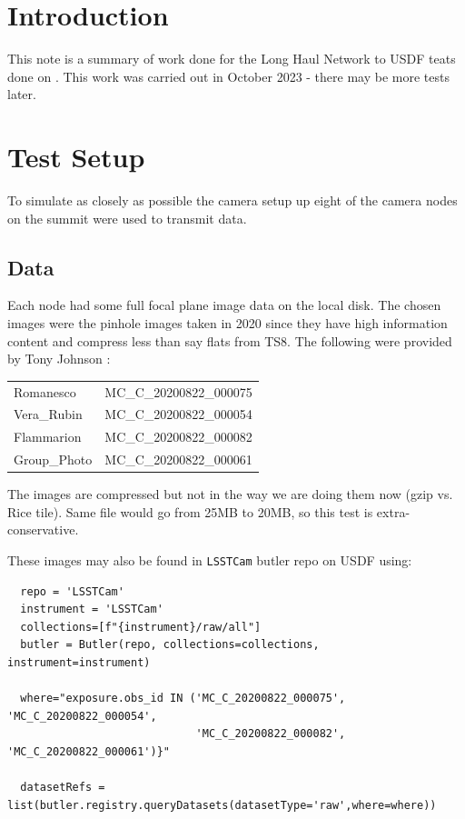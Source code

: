 
\section{Introduction}

This note is a summary of work done for the Long Haul Network to USDF teats done on .
This work was carried out in October 2023 - there may be more tests later.

\section {Test Setup}

To simulate as closely as possible the camera setup up eight of the camera nodes on the summit
were used to transmit data.

\subsection{Data}
Each node had some full focal plane image data on the local disk.
The chosen images were the pinhole images taken in 2020 since they have high information content and compress less than say flats from TS8.
The following  were provided by Tony Johnson :\\
\begin{tabular}{l l}
Romanesco  & MC\_C\_20200822\_000075\\
Vera\_Rubin & MC\_C\_20200822\_000054\\
Flammarion & MC\_C\_20200822\_000082\\
Group\_Photo & MC\_C\_20200822\_000061\\
\end{tabular}

The images are compressed but not in the way we are doing them now (gzip vs. Rice tile).  Same file would go from 25MB to 20MB, so this test is extra-conservative.

These images may also be found in {\tt LSSTCam}  butler repo on USDF  using:
\begin{verbatim}
  repo = 'LSSTCam'
  instrument = 'LSSTCam'
  collections=[f"{instrument}/raw/all"]
  butler = Butler(repo, collections=collections, instrument=instrument)

  where="exposure.obs_id IN ('MC_C_20200822_000075', 'MC_C_20200822_000054',
                             'MC_C_20200822_000082', 'MC_C_20200822_000061')}"

  datasetRefs = list(butler.registry.queryDatasets(datasetType='raw',where=where))

\end{verbatim}

